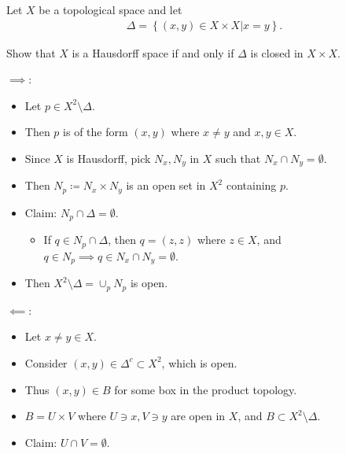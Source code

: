 \begin{problem}[?]

Let \(X\) be a topological space and let
\begin{align*}
\Delta = \left\{{(x, y) \in X \times X \mathrel{\Big|}x = y}\right\}
.\end{align*}

Show that \(X\) is a Hausdorff space if and only if \(\Delta\) is closed
in \(X \times X\).

\end{problem}

\begin{solution}

\envlist

\begin{concept}

\envlist

\end{concept}

\(\implies\):

\begin{itemize}
\tightlist
\item
  Let \(p\in X^2\setminus \Delta\).
\item
  Then \(p\) is of the form \((x, y)\) where \(x\neq y\) and
  \(x,y\in X\).
\item
  Since \(X\) is Hausdorff, pick \(N_x, N_y\) in \(X\) such that
  \(N_x \cap N_y = \emptyset\).
\item
  Then \(N_p\coloneqq N_x \times N_y\) is an open set in \(X^2\)
  containing \(p\).
\item
  Claim: \(N_p \cap\Delta = \emptyset\).

  \begin{itemize}
  \tightlist
  \item
    If \(q \in N_p \cap\Delta\), then \(q = (z, z)\) where \(z\in X\),
    and \(q\in N_p \implies q\in N_x \cap N_y = \emptyset\).
  \end{itemize}
\item
  Then \(X^2\setminus \Delta = \cup_p N_p\) is open.
\end{itemize}

\(\impliedby\):

\begin{itemize}
\tightlist
\item
  Let \(x\neq y\in X\).
\item
  Consider \((x, y) \in \Delta^c \subset X^2\), which is open.
\item
  Thus \((x, y) \in B\) for some box in the product topology.
\item
  \(B = U \times V\) where \(U\ni x, V\ni y\) are open in \(X\), and
  \(B \subset X^2\setminus \Delta\).
\item
  Claim: \(U\cap V = \emptyset\).


\end{itemize}
\end{solution}

